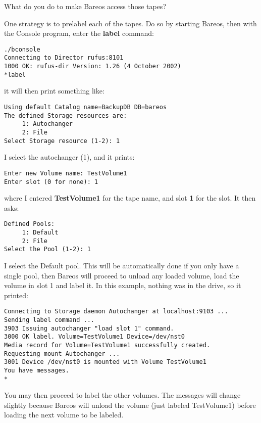 What do you do to make Bareos access those tapes?

One strategy is to prelabel each of the tapes. Do so by starting Bareos, then
with the Console program, enter the {\bf label} command:

\footnotesize
\begin{verbatim}
./bconsole
Connecting to Director rufus:8101
1000 OK: rufus-dir Version: 1.26 (4 October 2002)
*label
\end{verbatim}
\normalsize

it will then print something like:

\footnotesize
\begin{verbatim}
Using default Catalog name=BackupDB DB=bareos
The defined Storage resources are:
     1: Autochanger
     2: File
Select Storage resource (1-2): 1
\end{verbatim}
\normalsize

I select the autochanger (1), and it prints:

\footnotesize
\begin{verbatim}
Enter new Volume name: TestVolume1
Enter slot (0 for none): 1
\end{verbatim}
\normalsize

where I entered {\bf TestVolume1} for the tape name, and slot {\bf 1} for the
slot. It then asks:

\footnotesize
\begin{verbatim}
Defined Pools:
     1: Default
     2: File
Select the Pool (1-2): 1
\end{verbatim}
\normalsize

I select the Default pool. This will be automatically done if you only have a
single pool, then Bareos will proceed to unload any loaded volume, load the
volume in slot 1 and label it. In this example, nothing was in the drive, so
it printed:

\footnotesize
\begin{verbatim}
Connecting to Storage daemon Autochanger at localhost:9103 ...
Sending label command ...
3903 Issuing autochanger "load slot 1" command.
3000 OK label. Volume=TestVolume1 Device=/dev/nst0
Media record for Volume=TestVolume1 successfully created.
Requesting mount Autochanger ...
3001 Device /dev/nst0 is mounted with Volume TestVolume1
You have messages.
*
\end{verbatim}
\normalsize

You may then proceed to label the other volumes. The messages will change
slightly because Bareos will unload the volume (just labeled TestVolume1)
before loading the next volume to be labeled.

